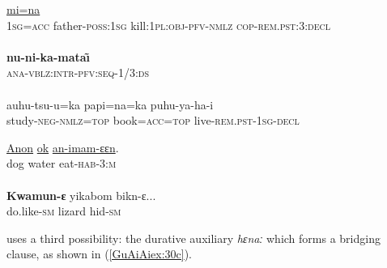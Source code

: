\documentclass[output=paper]{LSP/langsci}
\begin{document}
\begin{exe}
\ex \label{GuAiex:28ac}
\begin{xlist}
\ex \label{GuAiex:28a}
\gll \underline{mi=na}    \underline{}     \underline{}    \underline{}\\
 \textsc{1sg=acc}   father-\textsc{poss:1sg}   kill:\textsc{1pl:obj-pfv-nmlz}  \textsc{cop-rem.pst:3:decl}\\
\glt {} \\
\ex \label{GuAiex:28b}
\gll  \textbf{nu-ni-ka-mata\~\i}\\
 \textsc{ana-vblz:intr-pfv:seq-1/3:ds}\\
\glt {}\\
\ex \label{GuAiex:28c}
\gll auhu-tsu-u=ka     papi=na=ka     puhu-ya-ha-i\\
 study\textsc{-neg-nmlz=top}   book=\textsc{acc=top}   live-\textsc{rem.pst-1sg-decl}\\
\glt {}
\end{xlist}
\end{exe}


\begin{exe}
\ex \label{GuAiex:29ab}
\begin{xlist}
\ex \label{GuAiex:29a}
\gll \underline{Anon}    \underline{ok}   \underline{an-imam-ɛɛn}.\\
 dog   water   eat-\textsc{hab-3:m}\\
\glt {}\\ 
\ex \label{GuAiex:29b}
\gll \textbf{Kwamun-ɛ} yikabom   bikn-ɛ...\\
do.like-\textsc{sm}   lizard    hid-\textsc{sm}\\
\glt {}
\end{xlist}
\end{exe}


 uses a third possibility: the durative auxiliary \textit{hɛnaː} which forms a bridging clause, as shown in (\ref{GuAiAiex:30c}).
\end{document}
